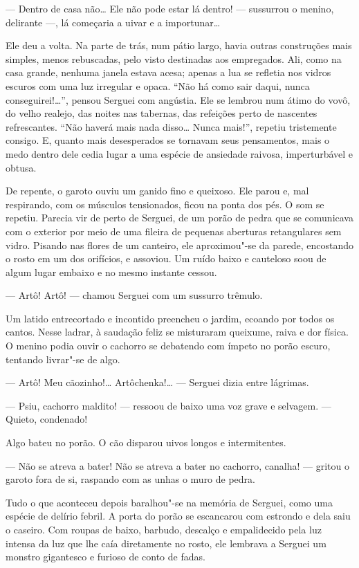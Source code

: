 --- Dentro de casa não\ldots{} Ele não pode estar lá dentro! --- sussurrou o
menino, delirante ---, lá começaria a uivar e a importunar\ldots{}

Ele deu a volta. Na parte de trás, num pátio largo, havia outras
construções mais simples, menos rebuscadas, pelo visto destinadas aos
empregados. Ali, como na casa grande, nenhuma janela estava acesa;
apenas a lua se refletia nos vidros escuros com uma luz irregular e
opaca. ``Não há como sair daqui, nunca conseguirei!\ldots{}'', pensou Serguei
com angústia. Ele se lembrou num átimo do vovô, do velho realejo, das
noites nas tabernas, das refeições perto de nascentes refrescantes.
``Não haverá mais nada disso\ldots{} Nunca mais!'', repetiu tristemente
consigo. E, quanto mais desesperados se tornavam seus pensamentos, mais
o medo dentro dele cedia lugar a uma espécie de ansiedade raivosa,
imperturbável e obtusa.

De repente, o garoto ouviu um ganido fino e queixoso. Ele parou e, mal
respirando, com os músculos tensionados, ficou na ponta dos pés. O som
se repetiu. Parecia vir de perto de Serguei, de um porão de pedra que se
comunicava com o exterior por meio de uma fileira de pequenas aberturas
retangulares sem vidro. Pisando nas flores de um canteiro, ele
aproximou"-se da parede, encostando o rosto em um dos orifícios, e
assoviou. Um ruído baixo e cauteloso soou de algum lugar embaixo e no
mesmo instante cessou.

--- Artô! Artô! --- chamou Serguei com um sussurro trêmulo.

Um latido entrecortado e incontido preencheu o jardim, ecoando por todos
os cantos. Nesse ladrar, à saudação feliz se misturaram queixume, raiva
e dor física. O menino podia ouvir o cachorro se debatendo com ímpeto no
porão escuro, tentando livrar"-se de algo.

--- Artô! Meu cãozinho!\ldots{} Artôchenka!\ldots{} --- Serguei dizia entre
lágrimas.

--- Psiu, cachorro maldito! --- ressoou de baixo uma voz grave e
selvagem. --- Quieto, condenado!

Algo bateu no porão. O cão disparou uivos longos e intermitentes.

--- Não se atreva a bater! Não se atreva a bater no cachorro, canalha!
--- gritou o garoto fora de si, raspando com as unhas o muro de pedra.

Tudo o que aconteceu depois baralhou"-se na memória de Serguei, como uma
espécie de delírio febril. A porta do porão se escancarou com estrondo e
dela saiu o caseiro. Com roupas de baixo, barbudo, descalço e
empalidecido pela luz intensa da luz que lhe caía diretamente no rosto,
ele lembrava a Serguei um monstro gigantesco e furioso de conto de
fadas.

